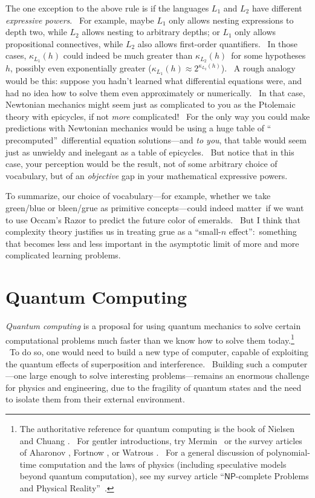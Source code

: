 \documentclass[11pt,onecolumn]{article}%
\begin{document}
The one exception to the above rule is if the languages $L_{1}$ and $L_{2}$
have different\textit{ expressive powers}. \ For example, maybe $L_{1}$ only
allows nesting expressions to depth two, while $L_{2}$ allows nesting to
arbitrary depths; or $L_{1}$ only allows propositional connectives, while
$L_{2}$ also allows first-order quantifiers. \ In those cases, $\kappa_{L_{1}%
}\left(  h\right)  $ could indeed be much greater than $\kappa_{L_{2}}\left(
h\right)  $\ for some hypotheses $h$, possibly even exponentially greater
($\kappa_{L_{1}}\left(  h\right)  \approx2^{\kappa_{L_{2}}\left(  h\right)  }%
$). \ A rough analogy would be this: suppose you hadn't learned what
differential equations were, and had no idea how to solve them even
approximately or numerically. \ In that case, Newtonian mechanics might seem
just as complicated to you as the Ptolemaic theory with epicycles, if not
\textit{more} complicated! \ For the only way you could make predictions with
Newtonian mechanics would be using a huge table of \textquotedblleft
precomputed\textquotedblright\ differential equation solutions---and
\textit{to you}, that table would seem just as unwieldy and inelegant as a
table of epicycles. \ But notice that in this case, your perception would be
the result, not of some arbitrary choice of vocabulary, but of an
\textit{objective} gap in your mathematical expressive powers.

To summarize, our choice of vocabulary---for example, whether we take
green/blue or bleen/grue as primitive concepts---could indeed matter\ if we
want to use Occam's Razor to predict the future color of emeralds. \ But I
think that complexity theory justifies us in treating grue as a
\textquotedblleft small-$n$ effect\textquotedblright:\ something that becomes
less and less important in the asymptotic limit of more and more complicated
learning problems.

\section{Quantum Computing\label{QC}}

\textit{Quantum computing} is a proposal for using quantum mechanics to solve
certain computational problems much faster than we know how to solve them
today.\footnote{The authoritative reference for quantum computing is the book
of Nielsen and Chuang \cite{nc}. \ For gentler introductions, try Mermin
\cite{mermin,mermin:book}\ or the survey articles of Aharonov
\cite{aharonov:review}, Fortnow \cite{fortnow:qc}, or Watrous
\cite{watrous:survey}. \ For a general discussion of polynomial-time
computation and the laws of physics (including speculative models beyond
quantum computation), see my survey article \textquotedblleft$\mathsf{NP}%
$-complete Problems and Physical Reality\textquotedblright\ \cite{aar:np}.}
\ To do so, one would need to build a new type of computer, capable of
exploiting the quantum effects of superposition and interference. \ Building
such a computer---one large enough to solve interesting problems---remains an
enormous challenge for physics and engineering, due to the fragility of
quantum states and the need to isolate them from their external environment.
\end{document}
